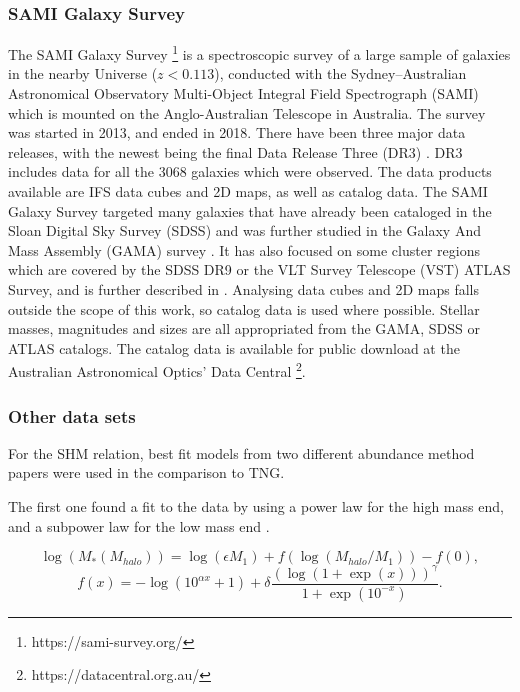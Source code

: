 \subsubsection{SAMI Galaxy Survey}
The SAMI Galaxy Survey \footnote{https://sami-survey.org/} is a spectroscopic survey of a large sample of galaxies in the nearby Universe ($z < 0.113$), conducted with the Sydney–Australian Astronomical Observatory Multi-Object Integral Field Spectrograph (SAMI) which is mounted on the Anglo-Australian Telescope in Australia. The survey was started in 2013, and ended in 2018. There have been three major data releases, with the newest being the final Data Release Three (DR3) \parencite{Scott2021}. DR3 includes data for all the 3068 galaxies which were observed. The data products available are IFS data cubes and 2D maps, as well as catalog data. The SAMI Galaxy Survey targeted many galaxies that have already been cataloged in the Sloan Digital Sky Survey (SDSS) and was further studied in the Galaxy And Mass Assembly (GAMA) survey \parencite{Driver2011}. It has also focused on some cluster regions which are covered by the SDSS DR9 or the VLT Survey Telescope (VST) ATLAS Survey, and is further described in \textcite{Owers2017}. Analysing data cubes and 2D maps falls outside the scope of this work, so catalog data is used where possible. Stellar masses, magnitudes and sizes are all appropriated from the GAMA, SDSS or ATLAS catalogs. The catalog data is available for public download at the Australian Astronomical Optics’ Data Central \footnote{https://datacentral.org.au/}.

\subsubsection{Other data sets}
For the SHM relation, best fit models from two different abundance method papers were used in the comparison to TNG.

The first one found a fit to the data by using a power law for the high mass end, and a subpower law for the low mass end \parencite{Behroozi2013}.

\begin{equation} \label{eq_behroozi}
    \log(M_*(M_{halo})) = \log(\epsilon M_1) + f(\log(M_{halo}/M_1)) -f(0),
\end{equation}
\begin{equation*}
    f(x) = -\log(10^{\alpha x}+1)+\delta \frac{(\log(1+\exp(x)))^\gamma}{1 +\exp(10^{-x})}.
\end{equation*}

